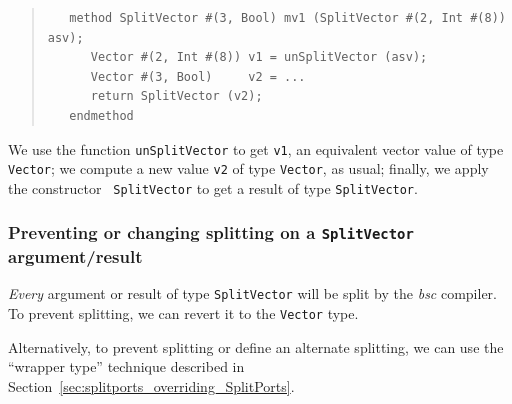 \begin{quote}
\begin{verbatim}
   method SplitVector #(3, Bool) mv1 (SplitVector #(2, Int #(8)) asv);
      Vector #(2, Int #(8)) v1 = unSplitVector (asv);
      Vector #(3, Bool)     v2 = ...
      return SplitVector (v2);
   endmethod
\end{verbatim}
\end{quote}

We use the function {\tt unSplitVector} to get {\tt v1}, an equivalent
vector value of type {\tt Vector}; we compute a new value {\tt v2} of
type {\tt Vector}, as usual; finally, we apply the constructor {\tt
  SplitVector} to get a result of type {\tt SplitVector}.


\subsubsection{Preventing or changing splitting on a {\tt SplitVector} argument/result}

\label{sec:splitvector_overriding_SplitVector}


\emph{Every} argument or result of type {\tt SplitVector} will be
split by the \emph{bsc} compiler.  To prevent splitting, we can revert
it to the {\tt Vector} type.

Alternatively, to prevent splitting or define an alternate splitting,
we can use the ``wrapper type''
technique described in
Section~\ref{sec:splitports_overriding_SplitPorts}.

